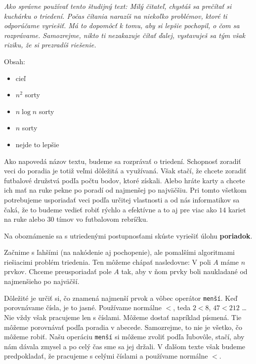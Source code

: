 




\textit{Ako správne používať tento študijný text: Milý čitateľ, chystáš sa prečítať si kuchárku o
triedení. Počas čítania narazíš na niekoľko problémov, ktoré ti odporúčame vyriešiť. Má to dopomôcť
k tomu, aby si lepšie pochopil, o čom sa rozprávame. Samozrejme, nikto ti nezakazuje čítať ďalej,
vystavuješ sa tým však riziku, že si prezradíš riešenie.}

Obsah:
\begin{itemize}
    \item cieľ
    \item $n^2$ sorty
    \item $n\log n$ sorty
    \item $n$ sorty
    \item nejde to lepšie
\end{itemize}

\medskip

Ako napovedá názov textu, budeme sa rozprávať o triedení. Schopnosť zoradiť veci do poradia je totiž
veľmi dôležitá a využívaná. Však stačí, že chcete zoradiť futbalové družstvá podľa počtu bodov, ktoré
získali. Alebo hráte karty a chcete ich mať na ruke pekne po poradí od najmenšej po najväčšiu. Pri
tomto všetkom potrebujeme usporiadať veci podľa určitej vlastnosti a od nás informatikov sa čaká, že
to budeme vedieť robiť rýchlo a efektívne a to aj pre viac ako $14$ kariet na ruke alebo $30$ tímov
vo futbalovom rebríčku.

\medskip

Na oboznámenie sa s utriedenými postupnosťami skúste vyriešiť úlohu \textbf{poriadok}.


Začnime s ľahšími (na nakódenie aj pochopenie), ale pomalšími algoritmami riešiacimi problém
triedenia. Ten môžeme chápať nasledovne: V poli $A$ máme $n$ prvkov. Chceme preusporiadať pole $A$
tak, aby v ňom prvky boli naukladané od najmenšieho po najväčší.

Dôležité je určiť si, čo znamená najmenší prvok a vôbec operátor \texttt{menší}. Keď porovnávame
čísla, je to jasné. Používame normálne $<$, teda $2<8$, $47<212$ \dots Nie vždy však pracujeme len s
číslami. Môžeme dostať napríklad písmená. Tie môžeme porovnávať podľa poradia v abecede. Samozrejme,
to nie je všetko, čo môžeme robiť. Našu operáciu \texttt{menší} si môžeme zvoliť podľa ľubovôle,
stačí, aby nám dávala zmysel a po celý čas sme sa jej držali. V ďalšom texte však budeme
predpokladať, že pracujeme s celými číslami a používame normálne $<$.

